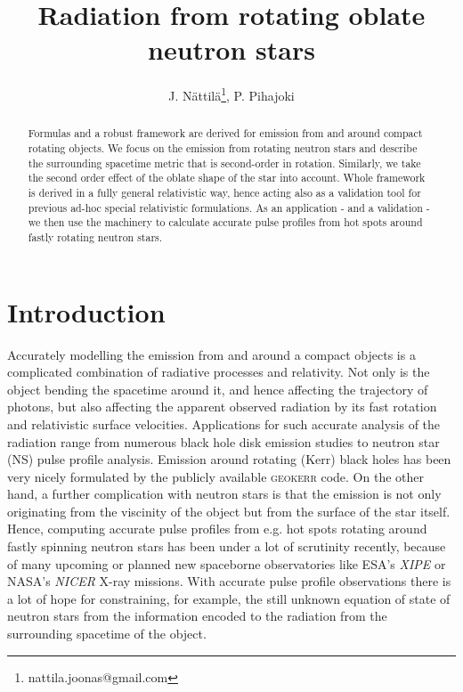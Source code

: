 \documentclass[iop, usenatbib]{emulateapj}
\begin{document}
\title{Radiation from rotating oblate neutron stars}

\author{J. N\"attil\"a\thanks{nattila.joonas@gmail.com},
  P. Pihajoki}

\affil{}


\begin{abstract}
Formulas and a robust framework are derived for emission from and around compact rotating objects.
We focus on the emission from rotating neutron stars and describe the surrounding spacetime metric that is second-order in rotation.
Similarly, we take the second order effect of the oblate shape of the star into account.
Whole framework is derived in a fully general relativistic way, hence acting also as a validation tool for previous ad-hoc special relativistic formulations.
As an application - and a validation -  we then use the machinery to calculate accurate pulse profiles from hot spots around fastly rotating neutron stars.
\end{abstract}

\section{Introduction}
Accurately modelling the emission from and around a compact objects is a complicated combination of radiative processes and relativity.
Not only is the object bending the spacetime around it, and hence affecting the trajectory of photons, but also affecting the apparent observed radiation by its fast rotation and relativistic surface velocities.
Applications for such accurate analysis of the radiation range from numerous black hole disk emission studies to neutron star (NS) pulse profile analysis.
Emission around rotating (Kerr) black holes has been very nicely formulated by the publicly available \textsc{geokerr} code.
On the other hand, a further complication with neutron stars is that the emission is not only originating from the viscinity of the object but from the surface of the star itself.
Hence, computing accurate pulse profiles from e.g. hot spots rotating around fastly spinning neutron stars has been under a lot of scrutinity recently, because of many upcoming or planned new spaceborne observatories like ESA's \textit{XIPE} or NASA's \textit{NICER} X-ray missions.
With accurate pulse profile observations there is a lot of hope for constraining, for example, the still unknown equation of state of neutron stars from the information encoded to the radiation from the surrounding spacetime of the object.
\end{document}
